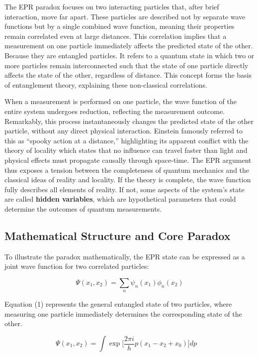 \documentclass[14pt,a4paper]{extarticle}
\begin{document}
The EPR paradox focuses on two interacting particles that, after brief interaction, move far apart. These particles are described not by separate wave functions but by a single combined wave function, meaning their properties remain correlated even at large distances. This correlation implies that a measurement on one particle immediately affects the predicted state of the other. Because they are entangled particles. It refers to a quantum state in which two or more particles remain interconnected such that the state of one particle directly affects the state of the other, regardless of distance. This concept forms the basis of entanglement theory, explaining these non-classical correlations.

When a measurement is performed on one particle, the wave function of the entire system undergoes reduction, reflecting the measurement outcome. Remarkably, this process instantaneously changes the predicted state of the other particle, without any direct physical interaction. Einstein famously referred to this as ``spooky action at a distance,'' highlighting its apparent conflict with the theory of locality which states that no influence can travel faster than light and physical effects must propagate causally through space-time. The EPR argument thus exposes a tension between the completeness of quantum mechanics and the classical ideas of reality and locality. If the theory is complete, the wave function fully describes all elements of reality. If not, some aspects of the system’s state are called \textbf{hidden variables}, which are hypothetical parameters that could determine the outcomes of quantum measurements.

\subsection{Mathematical Structure and Core Paradox}

To illustrate the paradox mathematically, the EPR state can be expressed as a joint wave function for two correlated particles:

\begin{equation}
\Psi(x_1, x_2) = \sum_n \psi_n(x_1) \phi_n(x_2)
\end{equation}

Equation (1) represents the general entangled state of two particles, where measuring one particle immediately determines the corresponding state of the other.

\begin{equation}
\Psi(x_1, x_2) = \int \exp \Big[ \frac{2\pi i}{h} p (x_1 - x_2 + x_0) \Big] dp \quad
\end{equation}
\end{document}
